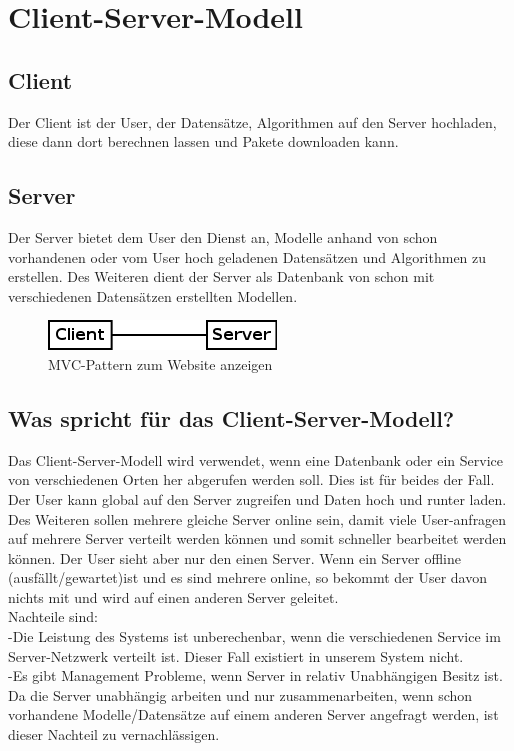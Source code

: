 \section{Client-Server-Modell}

\subsection*{Client}
Der Client ist der User, der Datensätze, Algorithmen auf den Server hochladen, diese dann dort berechnen lassen und Pakete downloaden kann.

\subsection*{Server}
Der Server bietet dem User den Dienst an, Modelle anhand von schon vorhandenen oder vom User hoch geladenen Datensätzen und Algorithmen zu erstellen. Des Weiteren dient der Server als Datenbank von schon mit verschiedenen Datensätzen erstellten Modellen.

\begin{figure}[h]
	\centering
	\includegraphics[scale=0.6]{../Grafik/Diagramm/Pattern/ClientServer/Kontext.png}
	\caption[MVC Website Klassen]{MVC-Pattern zum Website anzeigen}
\end{figure}

\subsection*{Was spricht für das Client-Server-Modell?}
Das Client-Server-Modell wird verwendet, wenn eine Datenbank oder ein Service von verschiedenen Orten her abgerufen werden soll. Dies ist für beides der Fall. Der User kann global auf den Server zugreifen und Daten hoch und runter laden.\\
Des Weiteren sollen mehrere gleiche Server online sein, damit viele User-anfragen auf mehrere Server verteilt werden können und somit schneller bearbeitet werden können. Der User sieht aber nur den einen Server. Wenn ein Server offline (ausfällt/gewartet)ist und es sind mehrere online, so bekommt der User davon nichts mit und wird auf einen anderen Server geleitet.\\
Nachteile sind:\\
-Die Leistung des Systems ist unberechenbar, wenn die verschiedenen Service im Server-Netzwerk verteilt ist. Dieser Fall existiert in unserem System nicht.\\
-Es gibt Management Probleme, wenn Server in relativ Unabhängigen Besitz ist. Da die Server unabhängig arbeiten und nur zusammenarbeiten, wenn schon vorhandene Modelle/Datensätze auf einem anderen Server angefragt werden, ist dieser Nachteil zu vernachlässigen.

